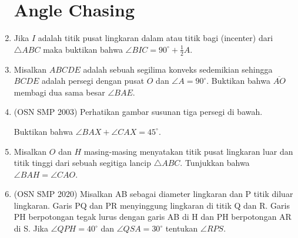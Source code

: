 \documentclass[12pt]{article}
\begin{document}
\begin{CJK*}{UTF8}{min}
\begin{enumerate}
\section{Angle Chasing}
    \item Jika $I$ adalah titik pusat lingkaran dalam atau titik bagi (incenter) dari $\triangle ABC$ maka buktikan bahwa
        $\angle BIC = 90^\circ + \frac{1}{2}A.$

    \item Misalkan $ABCDE$ adalah sebuah segilima konveks sedemikian sehingga $BCDE$ adalah persegi dengan pusat $O$ dan $\angle A = 90^\circ$. Buktikan bahwa $\overline{AO}$ membagi dua sama besar $\angle BAE$.

    \item (OSN SMP 2003) Perhatikan gambar susunan tiga persegi di bawah. 
    
    Buktikan bahwa $\angle BAX+\angle CAX=45^{\circ}$.
    

    \item Misalkan $O$ dan $H$ masing-masing menyatakan titik pusat lingkaran luar dan titik tinggi dari sebuah segitiga lancip $\triangle ABC$. Tunjukkan bahwa $\angle BAH = \angle CAO$.

    \item (OSN SMP 2020) Misalkan AB sebagai diameter lingkaran dan P titik diluar lingkaran. Garis PQ dan PR menyinggung lingkaran di titik Q dan R. Garis PH berpotongan tegak lurus dengan garis AB di H dan PH berpotongan AR di S. Jika $\angle QPH=40^{\circ}$ dan $\angle QSA=30^{\circ}$ tentukan $\angle RPS$.
        

\end{enumerate}
\end{CJK*}
\end{document}
